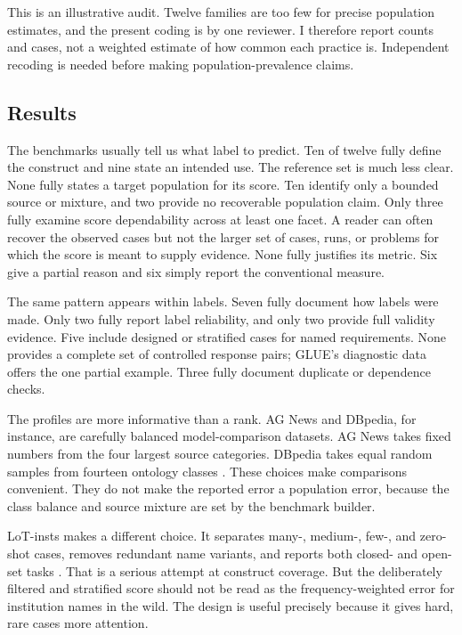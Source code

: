 \documentclass[11pt]{article}
\begin{document}
This is an illustrative audit. Twelve families are too few for precise population estimates, and the present coding is by one reviewer. I therefore report counts and cases, not a weighted estimate of how common each practice is. Independent recoding is needed before making population-prevalence claims.

\subsection*{Results}



The benchmarks usually tell us what label to predict. Ten of twelve fully define the construct and nine state an intended use. The reference set is much less clear. None fully states a target population for its score. Ten identify only a bounded source or mixture, and two provide no recoverable population claim. Only three fully examine score dependability across at least one facet. A reader can often recover the observed cases but not the larger set of cases, runs, or problems for which the score is meant to supply evidence. None fully justifies its metric. Six give a partial reason and six simply report the conventional measure.

The same pattern appears within labels. Seven fully document how labels were made. Only two fully report label reliability, and only two provide full validity evidence. Five include designed or stratified cases for named requirements. None provides a complete set of controlled response pairs; GLUE's diagnostic data offers the one partial example. Three fully document duplicate or dependence checks.

The profiles are more informative than a rank. AG News and DBpedia, for instance, are carefully balanced model-comparison datasets. AG News takes fixed numbers from the four largest source categories. DBpedia takes equal random samples from fourteen ontology classes \citep{zhang2015character}. These choices make comparisons convenient. They do not make the reported error a population error, because the class balance and source mixture are set by the benchmark builder.

LoT-insts makes a different choice. It separates many-, medium-, few-, and zero-shot cases, removes redundant name variants, and reports both closed- and open-set tasks \citep{qi2023lot}. That is a serious attempt at construct coverage. But the deliberately filtered and stratified score should not be read as the frequency-weighted error for institution names in the wild. The design is useful precisely because it gives hard, rare cases more attention.
\end{document}
